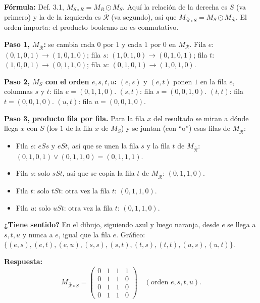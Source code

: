 \documentclass[11pt]{article}
\begin{document}
\begin{explica}
\textbf{Fórmula:} Def. 3.1, $M_{S\circ R}=M_R\odot M_S$. Aquí la relación de la derecha es $S$ (va primero) y la de la izquierda es $\overline{\mathcal R}$ (va segundo), así que $M_{\overline{\mathcal R}\circ S}=M_S\odot M_{\overline{\mathcal R}}$. El orden importa: el producto booleano no es conmutativo.

\textbf{Paso 1, $M_{\overline{\mathcal R}}$:} se cambia cada $0$ por $1$ y cada $1$ por $0$ en $M_{\mathcal R}$. Fila $e$: $(0,1,0,1)\to(1,0,1,0)$; fila $s$: $(1,0,1,0)\to(0,1,0,1)$; fila $t$: $(1,0,0,1)\to(0,1,1,0)$; fila $u$: $(0,1,0,1)\to(1,0,1,0)$.

\textbf{Paso 2, $M_S$ con el orden $e,s,t,u$:} $(e,s)$ y $(e,t)$ ponen $1$ en la fila $e$, columnas $s$ y $t$: fila $e=(0,1,1,0)$. $(s,t)$: fila $s=(0,0,1,0)$. $(t,t)$: fila $t=(0,0,1,0)$. $(u,t)$: fila $u=(0,0,1,0)$.

\textbf{Paso 3, producto fila por fila.} Para la fila $x$ del resultado se miran a dónde llega $x$ con $S$ (los $1$ de la fila $x$ de $M_S$) y se juntan (con ``o'') esas filas de $M_{\overline{\mathcal R}}$:
\begin{itemize}[leftmargin=1.2em,nosep]
\item Fila $e$: $eSs$ y $eSt$, así que se unen la fila $s$ y la fila $t$ de $M_{\overline{\mathcal R}}$: $(0,1,0,1)\vee(0,1,1,0)=(0,1,1,1)$.
\item Fila $s$: solo $sSt$, así que se copia la fila $t$ de $M_{\overline{\mathcal R}}$: $(0,1,1,0)$.
\item Fila $t$: solo $tSt$: otra vez la fila $t$: $(0,1,1,0)$.
\item Fila $u$: solo $uSt$: otra vez la fila $t$: $(0,1,1,0)$.
\end{itemize}

\textbf{¿Tiene sentido?} En el dibujo, siguiendo azul y luego naranja, desde $e$ se llega a $s,t,u$ y nunca a $e$, igual que la fila $e$. Gráfico: $\{(e,s),(e,t),(e,u),(s,s),(s,t),(t,s),(t,t),(u,s),(u,t)\}$.
\end{explica}

\textbf{Respuesta:}
\[M_{\overline{\mathcal R}\circ S}=\begin{pmatrix}0&1&1&1\\0&1&1&0\\0&1&1&0\\0&1&1&0\end{pmatrix}\quad(\text{orden } e,s,t,u).\]

\clearpage
\end{document}
